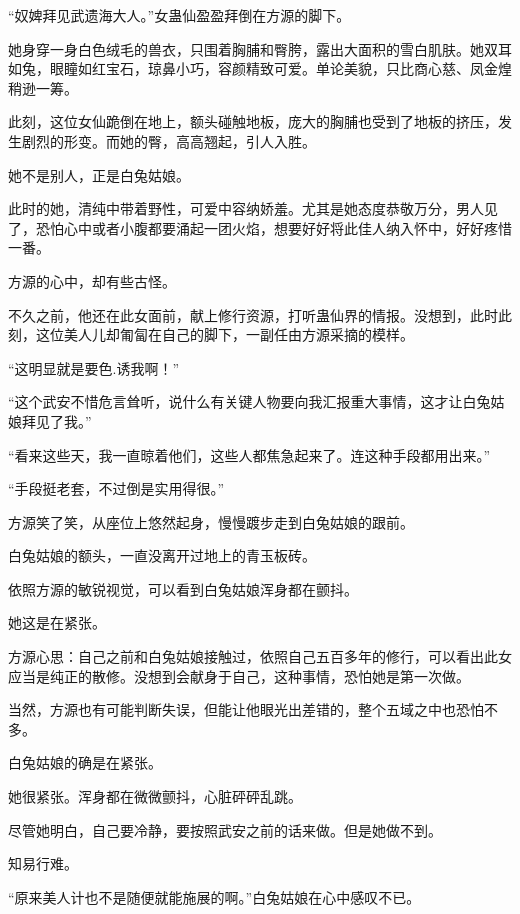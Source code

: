 
\begin{this_body}

“奴婢拜见武遗海大人。”女蛊仙盈盈拜倒在方源的脚下。

她身穿一身白色绒毛的兽衣，只围着胸脯和臀胯，露出大面积的雪白肌肤。她双耳如兔，眼瞳如红宝石，琼鼻小巧，容颜精致可爱。单论美貌，只比商心慈、凤金煌稍逊一筹。

此刻，这位女仙跪倒在地上，额头碰触地板，庞大的胸脯也受到了地板的挤压，发生剧烈的形变。而她的臀，高高翘起，引人入胜。

她不是别人，正是白兔姑娘。

此时的她，清纯中带着野性，可爱中容纳娇羞。尤其是她态度恭敬万分，男人见了，恐怕心中或者小腹都要涌起一团火焰，想要好好将此佳人纳入怀中，好好疼惜一番。

方源的心中，却有些古怪。

不久之前，他还在此女面前，献上修行资源，打听蛊仙界的情报。没想到，此时此刻，这位美人儿却匍匐在自己的脚下，一副任由方源采摘的模样。

“这明显就是要色.诱我啊！”

“这个武安不惜危言耸听，说什么有关键人物要向我汇报重大事情，这才让白兔姑娘拜见了我。”

“看来这些天，我一直晾着他们，这些人都焦急起来了。连这种手段都用出来。”

“手段挺老套，不过倒是实用得很。”

方源笑了笑，从座位上悠然起身，慢慢踱步走到白兔姑娘的跟前。

白兔姑娘的额头，一直没离开过地上的青玉板砖。

依照方源的敏锐视觉，可以看到白兔姑娘浑身都在颤抖。

她这是在紧张。

方源心思：自己之前和白兔姑娘接触过，依照自己五百多年的修行，可以看出此女应当是纯正的散修。没想到会献身于自己，这种事情，恐怕她是第一次做。

当然，方源也有可能判断失误，但能让他眼光出差错的，整个五域之中也恐怕不多。

白兔姑娘的确是在紧张。

她很紧张。浑身都在微微颤抖，心脏砰砰乱跳。

尽管她明白，自己要冷静，要按照武安之前的话来做。但是她做不到。

知易行难。

“原来美人计也不是随便就能施展的啊。”白兔姑娘在心中感叹不已。


\end{this_body}
